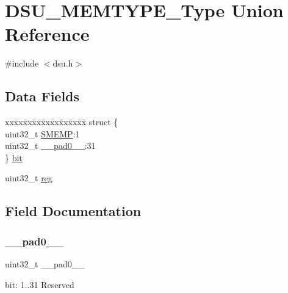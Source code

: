 \hypertarget{union_d_s_u___m_e_m_t_y_p_e___type}{}\section{D\+S\+U\+\_\+\+M\+E\+M\+T\+Y\+P\+E\+\_\+\+Type Union Reference}
\label{union_d_s_u___m_e_m_t_y_p_e___type}


{\ttfamily \#include $<$dsu.\+h$>$}

\subsection*{Data Fields}
\begin{DoxyCompactItemize}
\item 
\begin{tabbing}
xx\=xx\=xx\=xx\=xx\=xx\=xx\=xx\=xx\=\kill
struct \{\\
\>uint32\_t \mbox{\hyperlink{union_d_s_u___m_e_m_t_y_p_e___type_a2b3f5c16e144ac7f8a0f7448a27e8eed}{SMEMP}}:1\\
\>uint32\_t \mbox{\hyperlink{union_d_s_u___m_e_m_t_y_p_e___type_a3e57c2ef1c3ffb36722f000cc1156824}{\_\_pad0\_\_}}:31\\
\} \mbox{\hyperlink{union_d_s_u___m_e_m_t_y_p_e___type_a9399cca13027ad2b177d729c90bff132}{bit}}\\

\end{tabbing}\item 
uint32\+\_\+t \mbox{\hyperlink{union_d_s_u___m_e_m_t_y_p_e___type_a6b91636401516a477989a336376d7b40}{reg}}
\end{DoxyCompactItemize}


\subsection{Field Documentation}
\mbox{\label{union_d_s_u___m_e_m_t_y_p_e___type_a3e57c2ef1c3ffb36722f000cc1156824}} 
\subsubsection{\texorpdfstring{\_\_pad0\_\_}{\_\_pad0\_\_}}
{\footnotesize\ttfamily uint32\+\_\+t \+\_\+\+\_\+pad0\+\_\+\+\_\+}

bit\+: 1..31 Reserved \mbox{\label{union_d_s_u___m_e_m_t_y_p_e___type_a9399cca13027ad2b177d729c90bff132}} 
